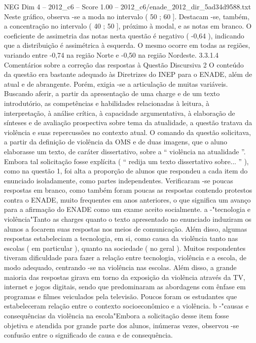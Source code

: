 \begin{textsample}{NEG Dim 4 – 2012\_c6 – Score 1.00 – 2012\_c6/enade\_2012\_dir\_5ad34d9588.txt}
Neste gráfico, observa -se a moda no intervalo ( 50 ; 60 ].
Destacam -se, também, a concentração no intervalo ( 40 ; 50 ], próximo à modal, e as notas em branco.
O coeficiente de assimetria das notas nesta questão é negativo ( -0,64 ), indicando que a distribuição é assimétrica à esquerda.
O mesmo ocorre em todas as regiões, variando entre -0,74 na região Norte e -0,50 na região Nordeste. 3.3.1.4 Comentários sobre a correção das respostas à Questão Discursiva 2 O conteúdo da questão era bastante adequado às Diretrizes do INEP para o ENADE, além de atual e de abrangente.
Porém, exigia -se a articulação de muitas variáveis.
Buscando aferir, a partir da apresentação de uma charge e de um texto introdutório, as competências e habilidades relacionadas à leitura, à interpretação, à análise crítica, à capacidade argumentativa, à elaboração de sínteses e de avaliação prospectiva sobre tema da atualidade, a questão tratava da violência e suas repercussões no contexto atual.
O comando da questão solicitava, a partir da definição de violência da OMS e de duas imagens, que o aluno elaborasse um texto, de caráter dissertativo, sobre a “ violência na atualidade ”.
Embora tal solicitação fosse explícita ( “ redija um texto dissertativo sobre... ” ), como na questão 1, foi alta a proporção de alunos que respondeu a cada item do enunciado isoladamente, como partes independentes.
Verificaram -se poucas respostas em branco, como também foram poucas as respostas contendo protestos contra o ENADE, muito frequentes em anos anteriores, o que significa um avanço para a afirmação do ENADE como um exame aceito socialmente. a -"tecnologia e violência"Tanto as charges quanto o texto apresentado no enunciado induziram os alunos a focarem suas respostas nos meios de comunicação.
Além disso, algumas respostas estabeleciam a tecnologia, em si, como causa da violência tanto nas escolas ( em particular ), quanto na sociedade ( no geral ).
Muitos respondentes tiveram dificuldade para fazer a relação entre tecnologia, violência e a escola, de modo adequado, centrando -se na violência nas escolas.
Além disso, a grande maioria das respostas girava em torno da exposição da violência através da TV, internet e jogos digitais, sendo que predominaram as abordagens com ênfase em programas e filmes veiculados pela televisão.
Poucos foram os estudantes que estabeleceram relação entre o contexto socioeconômico e a violência. b -"causas e consequências da violência na escola"Embora a solicitação desse item fosse objetiva e atendida por grande parte dos alunos, inúmeras vezes, observou -se confusão entre o significado de causa e de consequência.

\end{textsample}
